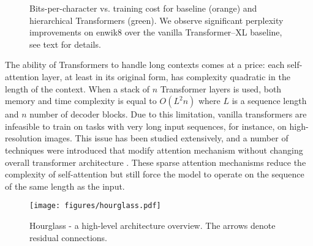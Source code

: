 \documentclass[11pt]{article}
\begin{document}
\begin{figure}[ht!]
\centering
\centering
\caption{Bits-per-character vs.
training cost for baseline (orange) and hierarchical Transformers (green).
We observe significant perplexity improvements on enwik8 over the vanilla Transformer–XL baseline, see text for details.
}
\label{fig:linear}
\end{figure}

The ability of Transformers to handle long contexts comes at a price:
each self-attention layer, at least in its original form, has complexity quadratic in the length of the context. When a stack of $n$ Transformer layers is used, both memory and time complexity is equal to $O(L^2 n)$ where $L$ is a sequence length and $n$ number of decoder blocks. Due to this limitation, vanilla transformers are infeasible to train on tasks with very long input sequences, for instance, on high-resolution images.
This issue has been studied extensively, and a number of techniques were introduced that modify attention mechanism without changing overall transformer architecture \cite{child2019generating,roy2020efficient,ren2021combiner}. These sparse attention mechanisms reduce the complexity of self-attention but still force the model to operate on the sequence of the same length as the input.

\begin{figure*}[t]
  \centering
  \texttt{[image: figures/hourglass.pdf]}
  \caption{Hourglass - a high-level architecture overview. The arrows denote residual connections.}
  \label{fig:model}
\end{figure*}
\end{document}
